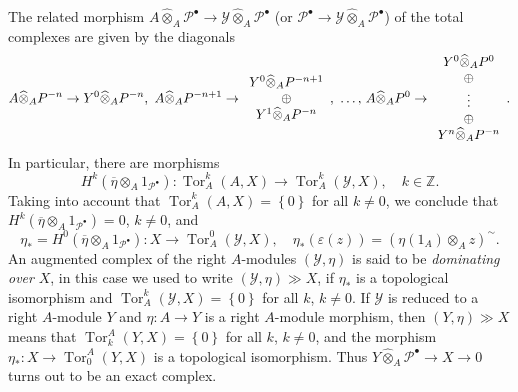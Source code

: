 \documentclass[12pt]{amsart}%
\theoremstyle{plain}
\numberwithin{equation}{section}
\numberwithin{equation}{section}
\numberwithin{theorem}{section}
\numberwithin{lemma}{section}
\numberwithin{remark}{section}
\numberwithin{example}{section}
\numberwithin{proposition}{section}
\numberwithin{definition}{section}
\numberwithin{corollary}{section}
\begin{document}
The related morphism $A\widehat{\otimes}_{A}\mathcal{P}^{\bullet
}\longrightarrow\mathcal{Y}\widehat{\otimes}_{A}\mathcal{P}^{\bullet}$ (or
$\mathcal{P}^{\bullet}\longrightarrow\mathcal{Y}\widehat{\otimes}%
_{A}\mathcal{P}^{\bullet}$) of the total complexes are given by the diagonals
\[
A\widehat{\otimes}_{A}P^{-n}\rightarrow Y^{0}\widehat{\otimes}_{A}%
P^{-n},\text{ }A\widehat{\otimes}_{A}P^{-n+1}\rightarrow%
\begin{array}
[c]{c}%
Y^{0}\widehat{\otimes}_{A}P^{-n+1}\\
\oplus\\
Y^{1}\widehat{\otimes}_{A}P^{-n}%
\end{array}
,\text{ \ldots, }A\widehat{\otimes}_{A}P^{0}\rightarrow%
\begin{array}
[c]{c}%
Y^{0}\widehat{\otimes}_{A}P^{0}\\
\oplus\\
\vdots\\
\oplus\\
Y^{n}\widehat{\otimes}_{A}P^{-n}%
\end{array}
.
\]
In particular, there are morphisms
\[
H^{k}\left(  \overline{\eta}\otimes_{A}1_{\mathcal{P}^{\bullet}}\right)
:\operatorname{Tor}_{A}^{k}\left(  A,X\right)  \rightarrow\operatorname{Tor}%
_{A}^{k}\left(  \mathcal{Y},X\right)  ,\quad k\in\mathbb{Z}\text{.}%
\]
Taking into account that $\operatorname{Tor}_{A}^{k}\left(  A,X\right)
=\left\{  0\right\}  $ for all $k\neq0$, we conclude that $H^{k}\left(
\overline{\eta}\otimes_{A}1_{\mathcal{P}^{\bullet}}\right)  =0$, $k\neq0$, and%
\[
\eta_{\ast}=H^{0}\left(  \overline{\eta}\otimes_{A}1_{\mathcal{P}^{\bullet}%
}\right)  :X\longrightarrow\operatorname{Tor}_{A}^{0}\left(  \mathcal{Y}%
,X\right)  ,\quad\eta_{\ast}\left(  \varepsilon\left(  z\right)  \right)
=\left(  \eta\left(  1_{A}\right)  \otimes_{A}z\right)  ^{\sim}.
\]
An augmented complex of the right $A$-modules $\left(  \mathcal{Y}%
,\eta\right)  $ is said to be \textit{dominating over} $X$, in this case we
used to write $\left(  \mathcal{Y},\eta\right)  \gg X$, if $\eta_{\ast}$ is a
topological isomorphism and $\operatorname{Tor}_{A}^{k}\left(  \mathcal{Y}%
,X\right)  =\left\{  0\right\}  $ for all $k$, $k\neq0$. If $\mathcal{Y}$ is
reduced to a right $A$-module $Y$ and $\eta:A\rightarrow Y$ is a right
$A$-module morphism, then $\left(  Y,\eta\right)  \gg X$ means that
$\operatorname{Tor}_{k}^{A}\left(  Y,X\right)  =\left\{  0\right\}  $ for all
$k$, $k\neq0$, and the morphism $\eta_{\ast}:X\rightarrow\operatorname{Tor}%
_{0}^{A}\left(  Y,X\right)  $ is a topological isomorphism. Thus
$Y\widehat{\otimes}_{A}\mathcal{P}^{\bullet}\longrightarrow X\rightarrow0$
turns out to be an exact complex.
\end{document}

